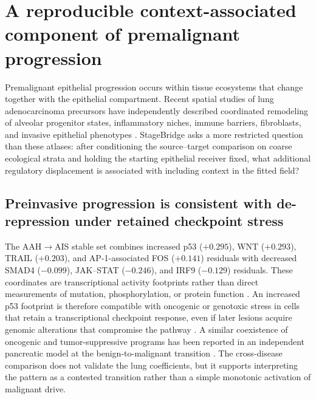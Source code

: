 \section{A reproducible context-associated component of premalignant progression}
\label{sec:biological-interpretation}

Premalignant epithelial progression occurs within tissue ecosystems that change together with the epithelial compartment. Recent spatial studies of lung adenocarcinoma precursors have independently described coordinated remodeling of alveolar progenitor states, inflammatory niches, immune barriers, fibroblasts, and invasive epithelial phenotypes \autocite{Peng2025-xu,Takano2024-gp,Cardoso2026-kp}. StageBridge asks a more restricted question than these atlases: after conditioning the source--target comparison on coarse ecological strata and holding the starting epithelial receiver fixed, what additional regulatory displacement is associated with including context in the fitted field?

\subsection{Preinvasive progression is consistent with de-repression under retained checkpoint stress}

The AAH$\rightarrow$AIS stable set combines increased p53 ($+0.295$), WNT ($+0.293$), TRAIL ($+0.203$), and AP-1-associated FOS ($+0.141$) residuals with decreased SMAD4 ($-0.099$), JAK--STAT ($-0.246$), and IRF9 ($-0.129$) residuals. These coordinates are transcriptional activity footprints rather than direct measurements of mutation, phosphorylation, or protein function \autocite{Schubert2018-ph}. An increased p53 footprint is therefore compatible with oncogenic or genotoxic stress in cells that retain a transcriptional checkpoint response, even if later lesions acquire genomic alterations that compromise the pathway \autocite{Haga2023-xc,Zhao2025-vm}. A similar coexistence of oncogenic and tumor-suppressive programs has been reported in an independent pancreatic model at the benign-to-malignant transition \autocite{Reyes2026-yr}. The cross-disease comparison does not validate the lung coefficients, but it supports interpreting the pattern as a contested transition rather than a simple monotonic activation of malignant drive.

